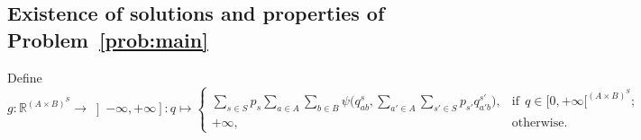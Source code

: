\documentclass[smallextended,referee,envcountsect,]{svjour3}
\newcommand{\RX}{\ensuremath{\left]-\infty,+\infty\right]}}
\newcommand{\R}{{\mathbb R}}
\newcommand{\pinf}{\ensuremath{{+\infty}}}
\begin{document}
\subsection{Existence of solutions and properties of 
Problem~\ref{prob:main}}
Define 
\begin{equation}
\label{e:defg}
g\colon\R^{(A\times B)^S}\to \RX\colon q \mapsto 
\begin{cases}
\sum\limits_{s\in S}p_s\sum\limits_{a\in A}\sum\limits_{b\in 
B}\psi\bigg(q_{ab}^s,\sum\limits_{a'\in A}\sum\limits_{s'\in 
S}p_{s'}q_{a'b}^{s'}\bigg),&\text{if}\:\:
 q\in 
[0,+\infty[^{(A\times B)^S};\\
\pinf,&\text{otherwise}.
\end{cases}
\end{equation}
\end{document}
